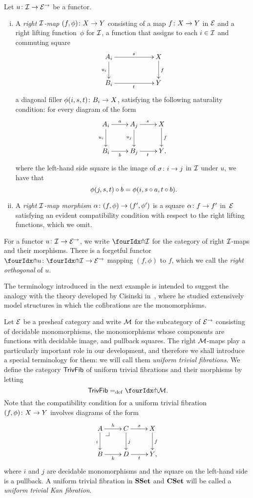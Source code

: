 \documentclass[reqno,10pt,a4paper,oneside,draft]{amsart}
\begin{document}
\begin{definition} \label{def:right-map}
Let $u \co \cal{I} \to \catE^\to$ be a functor.
\begin{enumerate}[(i)]
\item A \emph{right $\cal{I}$-map} $(f, \phi) \co X \to Y$ consisting of a map $f \co X \to Y$ in $\catE$ and a right lifting function~$\phi$ for $\cal{I}$, \ie a function that assigns to each $i \in \cal{I}$ and commuting square
\[
\xymatrix@C=2cm{
A_i \ar[r]^{s} \ar[d]_{u_i} & X \ar[d]^f \\
B_i \ar[r]_{t} & Y}
\]
a diagonal filler $\phi(i,s, t) \co B_i \to X$, satisfying the following naturality condition: for every diagram of the form
\[
\xymatrix{
A_i \ar[r]^a \ar[d]_{u_i} & A_j \ar[r]^{s} \ar[d]_{u_j} & X \ar[d]^f \\
B_i \ar[r]_{b} & B_j \ar[r]_{t} & Y \rlap{,}}
\]
where the left-hand side square is the image of $\sigma \co i \to j$ in $\cal{I}$ under $u$, we have that
\[
\phi(j, s, t) \cc b = \phi(i, s \cc a, t \cc b) \rlap{.}
\]
\item A \emph{right $\cal{I}$-map morphism} $\alpha \co (f, \phi) \to (f', \phi')$ is a square $\alpha \co f \to f'$ in~$\catE$ satisfying an evident compatibility condition with respect to the right lifting functions, which we omit.
\end{enumerate}
\end{definition}

For a functor $u \co \cal{I} \to \catE^\to$, we write $\liftr{\cal{I}}$ for the category of right $\cal{I}$-maps and their morphisms.
There is a forgetful functor~$\liftr{u} \co \liftr{\cal{I}} \to \catE^\to$ mapping $(f, \phi)$ to $f$, which we call the \emph{right orthogonal} of $u$.

The terminology introduced in the next example is intended to suggest the analogy with the theory developed by Cisinski in~\cite{cisinski-asterisque}, where he studied extensively model structures in which the cofibrations are the monomorphisms.

\begin{example} \label{exa-triv-kan-fib}
Let $\catE$ be a presheaf category and write $\cal{M}$ for the subcategory of $\catE^\to$ consisting of decidable monomorphisms, \ie the monomorphisms whose components are functions with decidable image, and pullback squares.
The right $\cal{M}$-maps play a particularly important role in our development, and therefore we shall introduce a special terminology for them: we will call them \emph{uniform trivial fibrations}.
We define the category $\TrivFib$ of uniform trivial fibrations and their morphisms by letting
\[
 \TrivFib \defeq \liftr{\cal{M}} \rlap{.}
\]
Note that the compatibility condition for a uniform trivial fibration $(f, \phi) \co X \to Y$ involves diagrams of the form
\[
\xymatrix{
A \ar[r]^{h} \ar[d]_{i} \pullback{dr} & C \ar[d]^{j} \ar[r]^s & X \ar[d]^f \\
B \ar[r]_{k} & D \ar[r]_t & Y \rlap{,}}
\]
where $i$ and $j$ are decidable monomorphisms and the square on the left-hand side is a pullback.
A uniform trivial fibration in $\SSet$ and $\CSet$ will be called a \emph{uniform trivial Kan fibration}.
\end{example}
\end{document}
